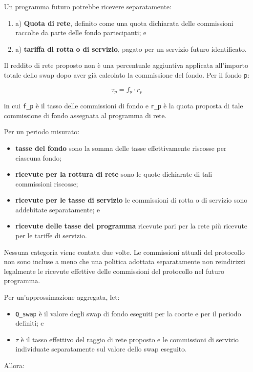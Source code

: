 \documentclass[11pt]{article}
\begin{document}
Un programma futuro potrebbe ricevere separatamente:

\begin{enumerate}[leftmargin=*]
\item a) \textbf{Quota di rete}, definito come una quota dichiarata delle commissioni raccolte da parte delle fondo partecipanti; e
\item a) \textbf{tariffa di rotta o di servizio}, pagato per un servizio futuro identificato.
\end{enumerate}
Il reddito di rete proposto non è una percentuale aggiuntiva applicata all'importo totale dello swap dopo aver già calcolato la commissione del fondo. Per il fondo \texttt{p}:

\[
\tau_p = f_p \cdot r_p
\]

in cui \texttt{f\_p} è il tasso delle commissioni di fondo e \texttt{r\_p} è la quota proposta di tale commissione di fondo assegnata al programma di rete.

Per un periodo misurato:

\begin{itemize}[leftmargin=*]
\item \textbf{tasse del fondo} sono la somma delle tasse effettivamente riscosse per ciascuna fondo;
\item \textbf{ricevute per la rottura di rete} sono le quote dichiarate di tali commissioni riscosse;
\item \textbf{ricevute per le tasse di servizio} le commissioni di rotta o di servizio sono addebitate separatamente; e
\item \textbf{ricevute delle tasse del programma} ricevute pari per la rete più ricevute per le tariffe di servizio.
\end{itemize}
Nessuna categoria viene contata due volte. Le commissioni attuali del protocollo non sono incluse a meno che una politica adottata separatamente non reindirizzi legalmente le ricevute effettive delle commissioni del protocollo nel futuro programma.

Per un'approssimazione aggregata, let:

\begin{itemize}[leftmargin=*]
\item \texttt{Q\_swap} è il valore degli swap di fondo eseguiti per la coorte e per il periodo definiti; e
\item \texttt{$\tau$} è il tasso effettivo del raggio di rete proposto e le commissioni di servizio individuate separatamente sul valore dello swap eseguito.
\end{itemize}
Allora:
\end{document}
